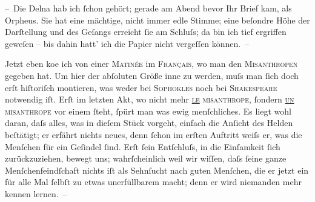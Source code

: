 \pstart
           – Die Delna hab ich{ }ſchon gehört; gerade am
               Abend bevor Ihr Brief kam, als Orpheus. Sie hat eine {\pb}mächtige, nicht immer
               edle Stimme; eine beſondre Höhe der Darſtellung und des Geſangs erreicht{ }ſie am
               Schluſs; da bin ich tief ergriffen geweſen – bis dahin hatt’ ich die Papier nicht vergeſſen können. –\pend
           
\pstart
           Jetzt eben ko{\geminationm}e ich von einer \textsc{Matinée} im \textsc{Français}, wo man den \textsc{Misanthropen} gegeben hat. Um hier der abſoluten Größe inne zu werden, muſs man{ }ſich doch
               erſt hiſtoriſch montieren, was weder bei \textsc{Sophokles} noch bei \textsc{Shakespeare} notwendig iſt. Erſt im letzten Akt, {\pb}wo nicht mehr
                  \textsc{\uline{le} misanthrope},{ }ſondern \textsc{\uline{un} misanthrope} vor einem{ }ſteht,{ }ſpürt man was
               ewig menſchliches. Es liegt wohl daran, daſs alles, was in dieſem Stück vorgeht, einfach die Anſicht des
               Helden beſtätigt; er erfährt nichts neues, denn{ }ſchon im erſten Auftritt weiſs er,
               was die Menſchen für ein Geſindel{ }ſind. Erſt{ }ſein Entſchluſs, in die Einſamkeit{ }ſich
               zurückzuziehen, bewegt uns; wahrſcheinlich weil wir wiſſen, daſs{ }ſeine ganze
               Menſchenfeindſchaft nichts {\pb}iſt als Sehnſucht nach guten
               Menſchen, die er jetzt ein für alle Mal{ }ſelbſt zu etwas unerfüllbarem macht; denn er
               wird niemanden mehr kennen lernen. –\pend
           
